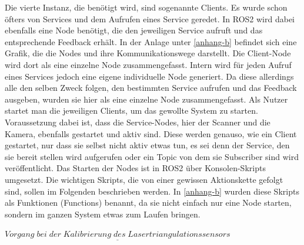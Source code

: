 		Die vierte Instanz, die benötigt wird, sind sogenannte Clients. Es wurde schon öfters von Services und dem Aufrufen eines Service geredet. In ROS2 wird dabei ebenfalls eine Node benötigt, die den jeweiligen Service aufruft und das entsprechende Feedback erhält. In der Anlage unter \ref{anhang-b} befindet sich eine Grafik, die die Nodes und ihre Kommunikationswege darstellt. Die Client-Node wird dort als eine einzelne Node zusammengefasst. Intern wird für jeden Aufruf eines Services jedoch eine eigene individuelle Node generiert. Da diese allerdings alle den selben Zweck folgen, den bestimmten Service aufrufen und das Feedback ausgeben, wurden sie hier als eine einzelne Node zusammengefasst. Als Nutzer startet man die jeweiligen Clients, um das gewollte System zu starten. Voraussetzung dabei ist, dass die Service-Nodes, hier der Scanner und die Kamera, ebenfalls gestartet und aktiv sind. Diese werden genauso, wie ein Client gestartet, nur dass sie selbst nicht aktiv etwas tun, es sei denn der Service, den sie bereit stellen wird aufgerufen oder ein Topic von dem sie Subscriber sind wird veröffentlicht. Das Starten der Nodes ist in ROS2 über Konsolen-Skripts umgesetzt. Die wichtigen Skripts, die von einer gewissen Aktionskette gefolgt sind, sollen im Folgenden beschrieben werden. In \ref{anhang-b} wurden diese Skripts als Funktionen (Functions) benannt, da sie nicht einfach nur eine Node starten, sondern im ganzen System etwas zum Laufen bringen.\newline
		
		$\underline{Vorgang\;bei\;der\;Kalibrierung\;des\;Lasertriangulationssensors}$
		
